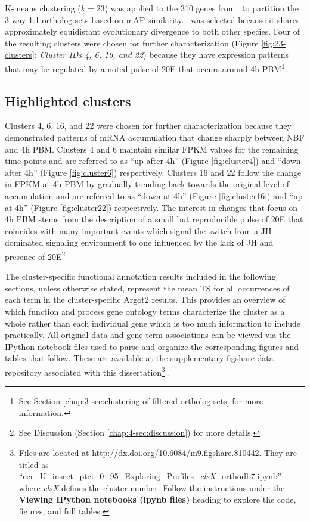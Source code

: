 K-means clustering ($k=23$) was applied to the 310 genes from \Ag\ to partition the 3-way 1:1 ortholog sets based on \gls{mAP} similarity.
%
\Ag\ was selected because it shares approximately equidistant evolutionary divergence to both other species.
%
Four of the resulting clusters were chosen for further characterization (Figure \ref{fig:23-clusters}: \textit{Cluster IDs 4, 6, 16, and 22}) because they have expression patterns that may be regulated by a noted pulse of \gls{20E} that occurs around 4h \gls{PBM}\footnote{See Section \ref{chap:3-sec:clustering-of-filtered-ortholog-sets} for more information.}.
%


\subsection{Highlighted clusters}

Clusters 4, 6, 16, and 22 were chosen for further characterization because they demonstrated patterns of mRNA accumulation that change sharply between \gls{NBF} and 4h \gls{PBM}.
%
Clusters 4 and 6 maintain similar \gls{FPKM} values for the remaining time points and are referred to as ``up after 4h'' (Figure \ref{fig:cluster4}) and ``down after 4h'' (Figure \ref{fig:cluster6}) respectively.
%
Clusters 16 and 22 follow the change in \gls{FPKM} at 4h \gls{PBM} by gradually trending back towards the original level of accumulation and are referred to as ``down at 4h'' (Figure \ref{fig:cluster16}) and ``up at 4h'' (Figure \ref{fig:cluster22}) respectively.
%
The interest in changes that focus on 4h \gls{PBM} stems from the description of a small but reproducible pulse of \gls{20E} that coincides with many important events which signal the switch from a \gls{JH} dominated signaling environment to one influenced by the lack of \gls{JH} and presence of \gls{20E}\footnote{See Discussion (Section \ref{chap:4-sec:discussion}) for more details.}

The cluster-specific functional annotation results included in the following sections, unless otherwise stated, represent the mean \gls{TS} for all occurrences of each term in the cluster-specific \gls{Argot2} results.
%
This provides an overview of which function and process gene ontology terms characterize the cluster as a whole rather than each individual gene which is too much information to include practically.
%
All original data and gene-term associations can be viewed via the IPython notebook files used to parse and organize the corresponding figures and tables that follow.
%
These are available at the supplementary figshare data repository associated with this dissertation\footnote{Files are located at \url{http://dx.doi.org/10.6084/m9.figshare.810442}. They are titled as ``ecr\_U\_insect\_ptci\_0\_95\_Exploring\_Profiles\_\textit{clsX}\_orthodb7.ipynb'' where \textit{clsX} defines the cluster number. Follow the instructions under the \textbf{Viewing IPython notebooks (ipynb files)} heading to explore the code, figures, and full tables.} \cite{Dunn2013dissSupl}.

